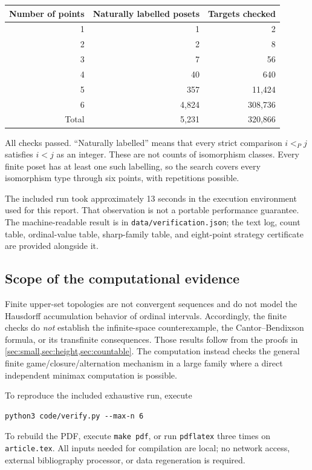 \documentclass[11pt,letterpaper]{article}
\numberwithin{equation}{section}
\theoremstyle{definition}
\theoremstyle{remark}
\begin{document}
\begin{center}
\begin{tabular}{@{}rrr@{}}
\toprule
Number of points & Naturally labelled posets & Targets checked\\
\midrule
1 & 1 & 2\\
2 & 2 & 8\\
3 & 7 & 56\\
4 & 40 & 640\\
5 & 357 & 11,424\\
6 & 4,824 & 308,736\\
\midrule
Total & 5,231 & 320,866\\
\bottomrule
\end{tabular}
\end{center}

All checks passed. ``Naturally labelled'' means that every strict comparison
$i<_{P}j$ satisfies $i<j$ as an integer. These are not counts of isomorphism
classes. Every finite poset has at least one such labelling, so the search
covers every isomorphism type through six points, with repetitions possible.

The included run took approximately 13 seconds in the execution environment
used for this report. That observation is not a portable performance guarantee.
The machine-readable result is in \texttt{data/verification.json}; the text log,
count table, ordinal-value table, sharp-family table, and eight-point strategy
certificate are provided alongside it.

\subsection{Scope of the computational evidence}

Finite upper-set topologies are not convergent sequences and do not model the
Hausdorff accumulation behavior of ordinal intervals. Accordingly, the finite
checks do \emph{not} establish the infinite-space counterexample, the
Cantor--Bendixson formula, or its transfinite consequences. Those results follow
from the proofs in \cref{sec:small,sec:height,sec:countable}. The computation
instead checks the general finite game/closure/alternation mechanism in a
large family where a direct independent minimax computation is possible.

To reproduce the included exhaustive run, execute
\begin{lstlisting}
python3 code/verify.py --max-n 6
\end{lstlisting}
To rebuild the PDF, execute \texttt{make pdf}, or run \texttt{pdflatex} three times on
\texttt{article.tex}. All inputs needed for compilation are local; no network
access, external bibliography processor, or data regeneration is required.
\end{document}
